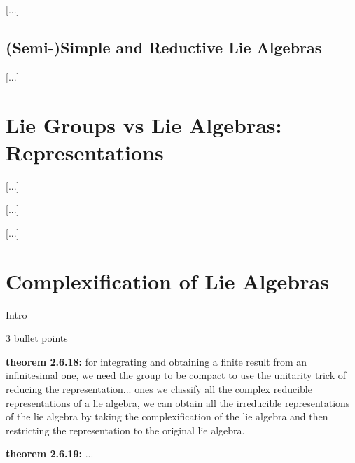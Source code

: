 [...]

\subsection{(Semi-)Simple and Reductive Lie Algebras}

[...]

\section{Lie Groups vs Lie Algebras: Representations}

 [...]

 [...]

 [...]

\section{Complexification of Lie Algebras}

Intro

3 bullet points

\textbf{theorem 2.6.18:} for integrating and obtaining a finite result from an infinitesimal one, we need the group to be compact to use the unitarity trick of reducing the representation...
ones we classify all the complex reducible representations of a lie algebra, we can obtain all the irreducible representations of the lie algebra by taking the complexification of the lie algebra and then restricting the representation to the original lie algebra.

\textbf{theorem 2.6.19:} ...
